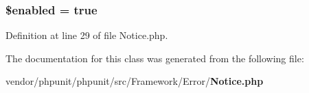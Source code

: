 \subsubsection[{\$enabled}]{\setlength{\rightskip}{0pt plus 5cm}\$enabled = true\hspace{0.3cm}{\ttfamily [static]}}\label{class_p_h_p_unit___framework___error___notice_a8d376199cc641e3e7af6e1a0d5c736d9}


Definition at line 29 of file Notice.\+php.



The documentation for this class was generated from the following file\+:\begin{DoxyCompactItemize}
\item 
vendor/phpunit/phpunit/src/\+Framework/\+Error/{\bf Notice.\+php}\end{DoxyCompactItemize}
